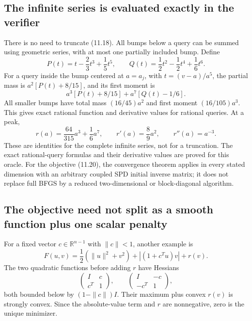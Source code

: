 

\subsection{The infinite series is evaluated exactly in the
verifier}\label{U:the-infinite-series-is-evaluated-exactly-in-the-verifier}

There is no need to truncate (11.18). All bumps below a query can be summed
using geometric series, with at most one partially included bump. Define
\[
 P(t)=t-\frac23t^3+\frac15t^5,\qquad
 Q(t)=\frac12t^2-\frac12t^4+\frac16t^6.
\] For a query inside the bump centered at \(a=a_j\), with
\(t=(v-a)/a^5\), the partial mass is \(a^2[P(t)+8/15]\), and its first
moment is \[
 a^3[P(t)+8/15]+a^7[Q(t)-1/6].
\] All smaller bumps have total mass \((16/45)a^2\) and first moment
\((16/105)a^3\). This gives exact rational function and derivative
values for rational queries. At a peak, \[
 r(a)=\frac{64}{315}a^3+\frac16a^7,\qquad
 r'(a)=\frac89a^2,\qquad r''(a)=a^{-3}.
\] These are identities for the complete infinite series, not for a truncation. The exact rational-query formulas and their derivative values are proved for this oracle. For the objective (11.20), the convergence theorem applies in every stated dimension with an arbitrary coupled SPD initial inverse matrix; it does not replace full BFGS by a reduced two-dimensional or block-diagonal algorithm.



\subsection{The objective need not split as a smooth function plus
one scalar
penalty}\label{U:the-objective-need-not-split-as-a-smooth-function-plus-one-scalar-penalty}

For a fixed vector \(c\in\mathbb R^{n-1}\) with \(\|c\|<1\), another
example is \[
 F(u,v)=\frac12(\|u\|^2+v^2)+|(1+c^Tu)v|+r(v).
\] The two quadratic functions before adding \(r\) have Hessians \[
 \begin{pmatrix}I&c\\c^T&1\end{pmatrix},\qquad
 \begin{pmatrix}I&-c\\-c^T&1\end{pmatrix},
\] both bounded below by \((1-\|c\|)I\). Their maximum plus convex
\(r(v)\) is strongly convex. Since the absolute-value term and \(r\) are
nonnegative, zero is the unique minimizer.


